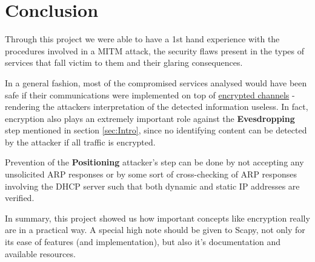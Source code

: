 \section{Conclusion}
\label{sec:Concl}

Through this project we were able to have a 1st hand experience with the 
procedures involved in a MITM attack, the security flaws present in the types
of services that fall victim to them and their glaring consequences.

In a general fashion, most of the compromised services analysed would have been 
safe if their communications were implemented on top of 
\underline{encrypted channels} - rendering the attackers interpretation of the 
detected information useless.
In fact, encryption also plays an extremely important role against the
\textbf{Evesdropping} step mentioned in section \ref{sec:Intro}, since no 
identifying content can be detected by the attacker if all traffic is encrypted.

Prevention of the \textbf{Positioning} attacker's step can be done by not 
accepting any unsolicited ARP responses or by some sort of cross-checking of 
ARP responses involving the DHCP server such that both dynamic and static IP
addresses are verified.

In summary, this project showed us how important concepts like encryption 
really are in a practical way.
A special high note should be given to Scapy, not only for its ease of features 
(and implementation), but also it's documentation and available resources.
